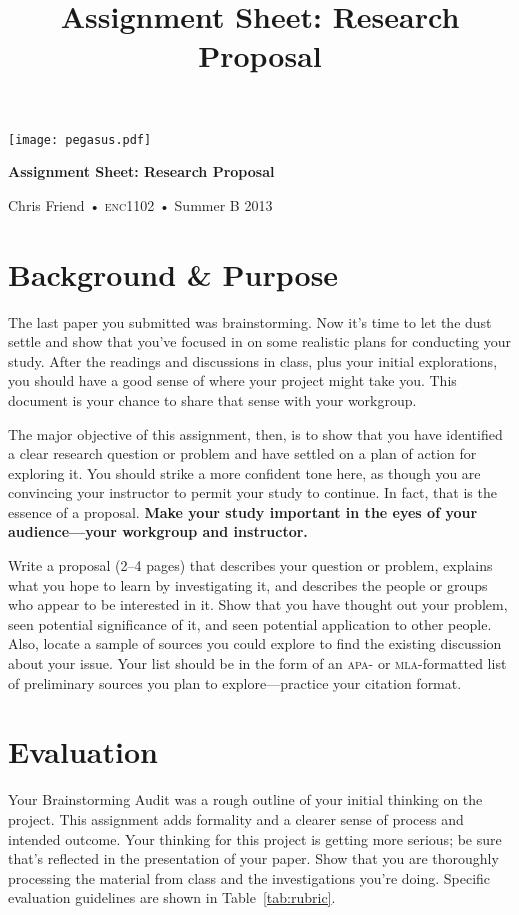 \documentclass[12pt, oneside]{amsart}	%
\title[Research Proposal]{Assignment Sheet: Research Proposal}
\begin{document}
%
\thispagestyle{empty}

\vspace{-2in}
\begin{center}
\huge
\texttt{[image: pegasus.pdf]}

\textbf{Assignment Sheet: Research Proposal}

{\normalsize Chris Friend • \textsc{enc1102} • Summer B 2013}
\end{center}
\vspace{1.5\baselineskip}

\section{Background \& Purpose} %
\label{sec:background}
The last paper you submitted was brainstorming. Now it's time to let the dust settle and show that you've focused in on some realistic plans for conducting your study. After the readings and discussions in class, plus your initial explorations, you should have a good sense of where your project might take you. This document is your chance to share that sense with your workgroup.

The major objective of this assignment, then, is to show that you have identified a clear research question or problem and have settled on a plan of action for exploring it. You should strike a more confident tone here, as though you are convincing your instructor to permit your study to continue. In fact, that is the essence of a proposal. \textbf{Make your study important in the eyes of your audience—your workgroup and instructor.}

Write a proposal (2--4 pages) that describes your question or problem, explains what you hope to learn by investigating it, and describes the people or groups who appear to be interested in it. Show that you have thought out your problem, seen potential significance of it, and seen potential application to other people. Also, locate a sample of sources you could explore to find the existing discussion about your issue. Your list should be in the form of an \textsc{apa}- or \textsc{mla}-formatted list of preliminary sources you plan to explore---practice your citation format.

\section{Evaluation} %
\label{sec:evaluation}
Your Brainstorming Audit was a rough outline of your initial thinking on the project. This assignment adds formality and a clearer sense of process and intended outcome. Your thinking for this project is getting more serious; be sure that's reflected in the presentation of your paper. Show that you are thoroughly processing the material from class and the investigations you're doing. Specific evaluation guidelines are shown in Table~\ref{tab:rubric}.
\end{document}
